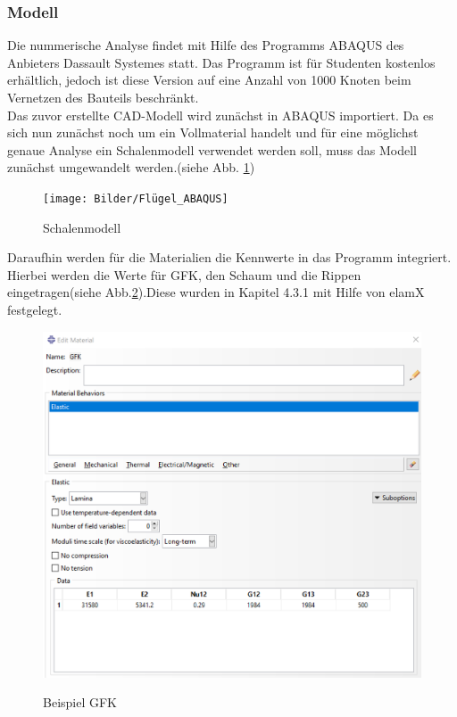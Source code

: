 
\subsubsection{Modell}
Die nummerische Analyse findet mit Hilfe des Programms ABAQUS des Anbieters Dassault Systemes statt. Das Programm ist für Studenten kostenlos erhältlich, jedoch ist diese Version auf eine Anzahl von 1000 Knoten beim Vernetzen des Bauteils beschränkt.\\
Das zuvor erstellte CAD-Modell wird zunächst in ABAQUS importiert. Da es sich nun zunächst noch um ein Vollmaterial handelt und für eine möglichst genaue Analyse ein Schalenmodell verwendet werden soll, muss das Modell zunächst umgewandelt werden.(siehe Abb. \ref{Schalenmodell})

\begin{figure}[h]
 \centering
 \texttt{[image: Bilder/Flügel\_ABAQUS]}\\
 \label{Schalenmodell}
 \caption{Schalenmodell}
\end{figure}
\newpage

Daraufhin werden für die Materialien die Kennwerte in das Programm integriert. Hierbei werden die Werte für GFK, den Schaum und die Rippen eingetragen(siehe Abb.\ref{Material}).Diese wurden in Kapitel 4.3.1 mit Hilfe von elamX festgelegt.\\
\begin{figure}[h]
 \centering
 \includegraphics[scale=0.4]{Bilder/Material_GFK}\\
 \label{Material}
 \caption{Beispiel GFK}
\end{figure}
\newpage

